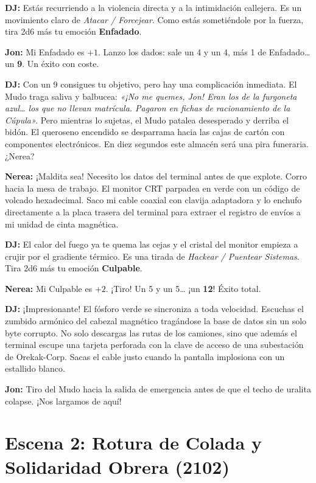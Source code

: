 \textbf{DJ:} Estás recurriendo a la violencia directa y a la intimidación callejera. Es un movimiento claro de \textit{Atacar / Forcejear}. Como estás sometiéndole por la fuerza, tira 2d6 más tu emoción \textbf{Enfadado}.

\textbf{Jon:} Mi Enfadado es $+1$. Lanzo los dados: sale un 4 y un 4, más 1 de Enfadado\dots{} un \textbf{9}. Un éxito con coste.

\textbf{DJ:} Con un 9 consigues tu objetivo, pero hay una complicación inmediata. El Mudo traga saliva y balbucea: \textit{«¡No me quemes, Jon! Eran los de la furgoneta azul\dots{} los que no llevan matrícula. Pagaron en fichas de racionamiento de la Cúpula».} Pero mientras lo sujetas, el Mudo patalea desesperado y derriba el bidón. El queroseno encendido se desparrama hacia las cajas de cartón con componentes electrónicos. En diez segundos este almacén será una pira funeraria. ¿Nerea?

\textbf{Nerea:} ¡Maldita sea! Necesito los datos del terminal antes de que explote. Corro hacia la mesa de trabajo. El monitor CRT parpadea en verde con un código de volcado hexadecimal. Saco mi cable coaxial con clavija adaptadora y lo enchufo directamente a la placa trasera del terminal para extraer el registro de envíos a mi unidad de cinta magnética.

\textbf{DJ:} El calor del fuego ya te quema las cejas y el cristal del monitor empieza a crujir por el gradiente térmico. Es una tirada de \textit{Hackear / Puentear Sistemas}. Tira 2d6 más tu emoción \textbf{Culpable}.

\textbf{Nerea:} Mi Culpable es $+2$. ¡Tiro! Un 5 y un 5\dots{} ¡un \textbf{12}! Éxito total.

\textbf{DJ:} ¡Impresionante! El fósforo verde se sincroniza a toda velocidad. Escuchas el zumbido armónico del cabezal magnético tragándose la base de datos sin un solo byte corrupto. No solo descargas las rutas de los camiones, sino que además el terminal escupe una tarjeta perforada con la clave de acceso de una subestación de Orekak-Corp. Sacas el cable justo cuando la pantalla implosiona con un estallido blanco.

\textbf{Jon:} Tiro del Mudo hacia la salida de emergencia antes de que el techo de uralita colapse. ¡Nos largamos de aquí!

\section{Escena 2: Rotura de Colada y Solidaridad Obrera (2102)}

